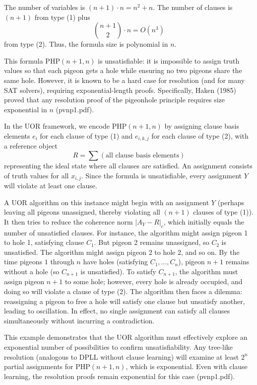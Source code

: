 \documentclass{article}
\begin{document}
The number of variables is $(n+1)\cdot n = n^2+n$. The number of clauses is $(n+1)$ from type (1) plus 
\[
\binom{n+1}{2} \cdot n = O(n^3)
\]
from type (2). Thus, the formula size is polynomial in $n$.

This formula $\mathrm{PHP}(n+1,n)$ is unsatisfiable: it is impossible to assign truth values so that each pigeon gets a hole while ensuring no two pigeons share the same hole. However, it is known to be a hard case for resolution (and for many SAT solvers), requiring exponential-length proofs. Specifically, Haken (1985) proved that any resolution proof of the pigeonhole principle requires size exponential in $n$ (pvnp1.pdf).

\medskip
In the UOR framework, we encode $\mathrm{PHP}(n+1,n)$ by assigning clause basis elements $e_{i}$ for each clause of type (1) and $e_{i,k,j}$ for each clause of type (2), with a reference object 
\[
R = \sum (\text{all clause basis elements})
\]
representing the ideal state where all clauses are satisfied. An assignment consists of truth values for all $x_{i,j}$. Since the formula is unsatisfiable, every assignment $Y$ will violate at least one clause.

A UOR algorithm on this instance might begin with an assignment $Y$ (perhaps leaving all pigeons unassigned, thereby violating all $(n+1)$ clauses of type (1)). It then tries to reduce the coherence norm $|A_Y - R|_c$, which initially equals the number of unsatisfied clauses. For instance, the algorithm might assign pigeon 1 to hole 1, satisfying clause $C_1$. But pigeon 2 remains unassigned, so $C_2$ is unsatisfied. The algorithm might assign pigeon 2 to hole 2, and so on. By the time pigeons $1$ through $n$ have holes (satisfying $C_1, \dots, C_n$), pigeon $n+1$ remains without a hole (so $C_{n+1}$ is unsatisfied). To satisfy $C_{n+1}$, the algorithm must assign pigeon $n+1$ to some hole; however, every hole is already occupied, and doing so will violate a clause of type (2). The algorithm then faces a dilemma: reassigning a pigeon to free a hole will satisfy one clause but unsatisfy another, leading to oscillation. In effect, no single assignment can satisfy all clauses simultaneously without incurring a contradiction.

\medskip
This example demonstrates that the UOR algorithm must effectively explore an exponential number of possibilities to confirm unsatisfiability. Any tree-like resolution (analogous to DPLL without clause learning) will examine at least $2^n$ partial assignments for $\mathrm{PHP}(n+1,n)$, which is exponential. Even with clause learning, the resolution proofs remain exponential for this case (pvnp1.pdf).
\end{document}
